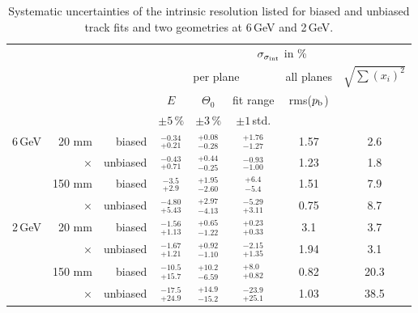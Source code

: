 \begin{table}[tbp]
\caption[Systematic uncertainties]{Systematic uncertainties of the intrinsic resolution listed for biased and unbiased track fits and two geometries at 6\,GeV and 2\,GeV.}
 \begin{center}
  \begin{tabular}{r|r|r|c|c|c|c||c}
  \multicolumn{3}{c|}{} & \multicolumn{5}{c}{$\sigma_{\sigma_{\textrm{int}}}$ in \%}\\
  \multicolumn{3}{c|}{} & \multicolumn{3}{c|}{per plane} & all planes& $\sqrt{\sum (x_i)^2}$\\
  \multicolumn{3}{c|}{} &$E$         & $\Theta_0$      & fit range    & rms($p_{\textrm{b}}$) &  \\ 
  \multicolumn{3}{c|}{} & $\pm5\,\%$ &  $\pm 3\,\%$  & $\pm 1\,$std.&               &  \\ \hline
  6\,GeV & 20 mm   &  biased  &  ${}^{-0.34}_{+0.21}$ & ${}^{+0.08}_{-0.28}$ & ${}^{+1.76}_{-1.27}$ & 1.57 &  2.6  \\
         & ×       & unbiased &  ${}^{-0.43}_{+0.71}$ & ${}^{+0.44}_{-0.25}$ & ${}^{-0.93}_{-1.00}$ & 1.23 &  1.8  \\
	 & 150 mm  &  biased  &  ${}^{-3.5}_{+2.9}$   & ${}^{+1.95}_{-2.60}$ & ${}^{+6.4}_{-5.4}$   & 1.51 &  7.9  \\
	 & ×       & unbiased &  ${}^{-4.80}_{+5.43}$ & ${}^{+2.97}_{-4.13}$ & ${}^{-5.29}_{+3.11}$ & 0.75 &  8.7  \\ \hline
  2\,GeV & 20 mm   &  biased  &  ${}^{-1.56}_{+1.13}$ & ${}^{+0.65}_{-1.22}$ & ${}^{+0.23}_{+0.33}$ &  3.1 &  3.7  \\
         & ×       & unbiased &  ${}^{-1.67}_{+1.21}$ & ${}^{+0.92}_{-1.10}$ & ${}^{-2.15}_{+1.35}$ & 1.94 &  3.1  \\
	 & 150 mm  &  biased  &  ${}^{-10.5}_{+15.7}$ & ${}^{+10.2}_{-6.59}$ & ${}^{+8.0}_{+0.82}$  & 0.82 &  20.3 \\
	 & ×       & unbiased &  ${}^{-17.5}_{+24.9}$ & ${}^{+14.9}_{-15.2}$ & ${}^{-23.9}_{+25.1}$ & 1.03 &  38.5  \\ 
  \end{tabular}
  \label{tab:uncerts}
 \end{center}
\end{table}

